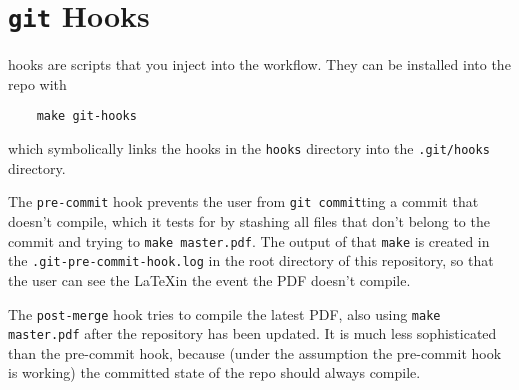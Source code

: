\section{\texttt{git} Hooks}

\git hooks are scripts that you inject into the \git workflow.
They can be installed into the repo with
\begin{verbatim}
    make git-hooks
\end{verbatim}
which symbolically links the hooks in the \texttt{hooks} directory into the \texttt{.git/hooks} directory.

The \texttt{pre-commit} hook prevents the user from \texttt{git commit}ting a commit that doesn't compile, which it tests for by stashing all files that don't belong to the commit and trying to \texttt{make master.pdf}.  The output of that \texttt{make} is created in the \texttt{.git-pre-commit-hook.log} in the root directory of this repository, so that the user can see the \LaTeX in the event the PDF doesn't compile.

The \texttt{post-merge} hook tries to compile the latest PDF, also using \texttt{make master.pdf} after the repository has been updated.
It is much less sophisticated than the pre-commit hook, because (under the assumption the pre-commit hook is working) the committed state of the repo should always compile.
